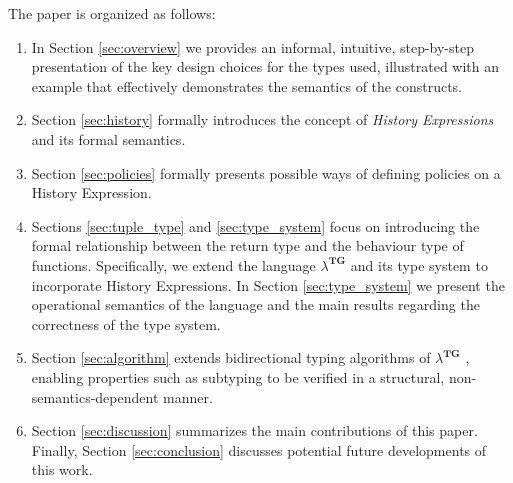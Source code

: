 The paper is organized as follows:
\begin{enumerate}
    \item In Section \ref{sec:overview} we provides an informal, intuitive, step-by-step presentation of the key design choices for the types used, illustrated with an example that effectively demonstrates the semantics of the constructs.
    \item Section \ref{sec:history} formally introduces the concept of \emph{History Expressions} and its formal semantics.
    \item Section \ref{sec:policies} formally presents possible ways of defining policies on a History Expression. 
    \item Sections \ref{sec:tuple_type} and \ref{sec:type_system} focus on introducing the formal relationship between the return type and the behaviour type of functions. Specifically, we extend the language $\lambda^{\textbf{TG}}$ and its type system \cite{coverage} to incorporate History Expressions. In Section \ref{sec:type_system} we present the operational semantics of the language and the main results regarding the correctness of the type system.
    \item Section \ref{sec:algorithm} extends bidirectional typing algorithms \cite{bidirectional-typing} of $\lambda^{\textbf{TG}}$ \cite{coverage}, enabling properties such as subtyping to be verified in a structural, non-semantics-dependent manner.
    \item Section \ref{sec:discussion} summarizes the main contributions of this paper. Finally, Section \ref{sec:conclusion} discusses potential future developments of this work.
\end{enumerate}